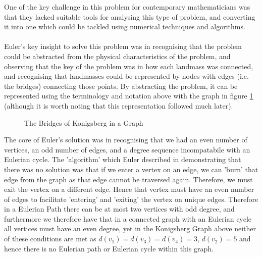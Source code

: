 \documentclass[11pt,reqno]{amsart}
\theoremstyle{definition}
\numberwithin{equation}{section}
\begin{document}
\noindent One of the key challenge in this problem for contemporary mathematicians was that they lacked suitable tools for analysing this type of problem, and converting it into one which could be tackled using numerical techniques and algorithms.\\
\\
Euler's key insight to solve this problem was in recognising that the problem could be abstracted from the physical characteristics of the problem, and observing that the key of the problem was in how each landmass was connected, and recognising that landmasses could be represented by nodes with edges (i.e. the bridges) connecting those points. By abstracting the problem, it can be represented using the terminology and notation above with the graph in figure \ref{fig:KonigGraph} (although it is worth noting that this representation followed much later).
\begin{figure}[h!]
		\caption{The Bridges of Konigsberg in a Graph}
		\label{fig:KonigGraph}
\end{figure}
\noindent The core of Euler's solution was in recognising that we had an even number of vertices, an odd number of edges, and a degree sequence incompatabile with an Eulerian cycle. The 'algorithm' which Euler described in demonstrating that there was no solution was that if we enter a vertex on an edge, we can 'burn' that edge from the graph as that edge cannot be traversed again. Therefore, we must exit the vertex on a different edge. Hence that vertex must have an even number of edges to facilitate 'entering' and 'exiting' the vertex on unique edges. Therefore in a Eulerian Path there can be at most two vertices with odd degree, and furthermore we therefore have that in a connected graph with an Eulerian cycle all vertices must have an even degree, yet in the Konigsberg Graph above neither of these conditions are met as $d(v_1)=d(v_3)=d(v_4)=3$, $d(v_2)=5$ and hence there is no Eulerian path or Eulerian cycle within this graph.
\end{document}
